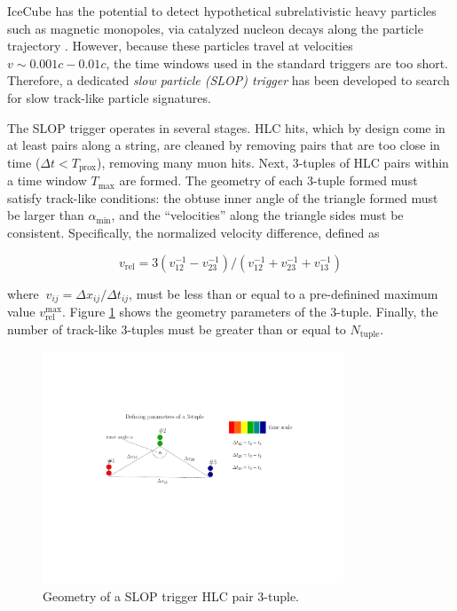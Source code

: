IceCube has the potential to detect hypothetical subrelativistic heavy
particles such as magnetic monopoles, via catalyzed nucleon decays along
the particle trajectory \cite{IC3:monopole}.  However, because these
particles travel at velocities $v \sim 0.001c - 0.01c$, the
time windows used in the standard triggers are too short.  Therefore, a
dedicated \emph{slow particle (SLOP) trigger} has been developed to
search for slow track-like particle signatures.

The SLOP trigger operates in several stages.  HLC hits, which by
design come in at least pairs along a string, are cleaned by removing pairs
that are too close in time ($\Delta t < T_{\mathrm{prox}}$), removing
many muon hits.  Next, 3-tuples of HLC pairs within a time window
$T_{\mathrm{max}}$ are formed.  The geometry of each
3-tuple formed must satisfy track-like conditions: the obtuse inner angle
of the triangle formed must be larger than $\alpha_{\mathrm{min}}$, and the
``velocities'' along the triangle sides must be consistent.  Specifically,
the normalized velocity difference, defined as

\begin{equation}
  v_{\mathrm{rel}} =
  3(v^{-1}_{12} - v^{-1}_{23})/(v^{-1}_{12} + v^{-1}_{23} +
  v^{-1}_{13})
\end{equation}

\noindent where $\ v_{ij} = \Delta x_{ij}/\Delta t_{ij}$, must be less than
or equal to a pre-definined maximum value
$v_{\mathrm{rel}}^{\mathrm{max}}$.  Figure \ref{fig:slop} 
shows the geometry parameters of the 3-tuple.  Finally, the number of track-like
3-tuples must be greater than or equal to $N_{\mathrm{tuple}}$.  

\begin{figure}[!h]
 \centering
 \includegraphics[width=0.8\textwidth]{graphics/online/trigger/slop.pdf}
 \caption{Geometry of a SLOP trigger HLC pair 3-tuple.}
 \label{fig:slop}
\end{figure}

